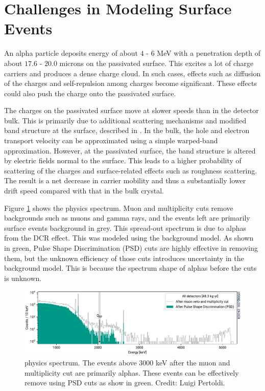 \section{Challenges in Modeling Surface Events}
An alpha particle deposits energy of about $4$ - $6$ MeV with a penetration depth of about $17.6$ - $20.0$ microns on the passivated surface. This excites a lot of charge carriers and produces a dense charge cloud. In such cases, effects such as diffusion of the charges and self-repulsion among charges become significant. These effects could also push the charge onto the passivated surface. 

The charges on the passivated surface move at slower speeds than in the detector bulk. This is primarily due to additional scattering mechanisms and modified band structure at the surface, described in \cite{MULLOWNEY201233}. In the bulk, the hole and electron transport velocity can be approximated using a simple warped-band approximation. However, at the passivated surface, the band structure is altered by electric fields normal to the surface. This leads to a higher probability of scattering of the charges and surface-related effects such as roughness scattering. The result is a net decrease in carrier mobility and thus a substantially lower drift speed compared with that in the bulk crystal.

Figure \ref{ch3_fig_L200_surface_background} shows the {\Ltwo} physics spectrum. Muon and multiplicity cuts remove backgrounds such as muons and gamma rays, and the events left are primarily surface events background in grey. This spread-out spectrum is due to alphas from the DCR effect. This was modeled using the {\Gerda} background model. As shown in green, Pulse Shape Discrimination (PSD) cuts are highly effective in removing them, but the unknown efficiency of those cuts introduces uncertainty in the background model. This is because the spectrum shape of alphas before the cuts is unknown.

\begin{figure}[!htb]
\centering
  \includegraphics[width=0.99\linewidth]{ch2/figs/l200-phy-spectrum-psd.pdf}
  \caption{{\Ltwo} physics spectrum. The events above 3000 keV after the muon and multiplicity cut are primarily alphas. These events can be effectively remove using PSD cuts as show in green. Credit: Luigi Pertoldi.}
\label{ch3_fig_L200_surface_background}
\end{figure}

